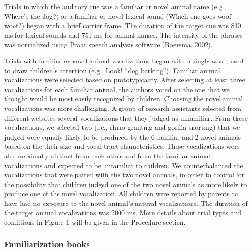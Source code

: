 \documentclass[english,floatsintext,man]{apa6}
\newcounter{author}
\theoremstyle{definition}
\theoremstyle{definition}
\theoremstyle{definition}
\theoremstyle{remark}
\begin{document}
Trials in which the auditory cue was a familiar or novel animal name
(e.g., Where's the dog?) or a familiar or novel lexical sound (Which one
goes woof-woof?) began with a brief carrier frame. The duration of the
target cue was 810 ms for lexical sounds and 750 ms for animal names.
The intensity of the phrases was normalized using Praat speech analysis
software (Boersma, 2002).

Trials with familiar or novel animal vocalizations began with a single
word, used to draw children's attention (e.g., Look! \enquote{dog
barking}). Familiar animal vocalizations were selected based on
prototypicality. After selecting at least three vocalizations for each
familiar animal, the authors voted on the one that we thought would be
most easily recognized by children. Choosing the novel animal
vocalizations was more challenging. A group of research assistants
selected from different websites several vocalizations that they judged
as unfamiliar. From these vocalizations, we selected two (i.e., rhino
grunting and gorilla snorting) that we judged were equally likely to be
produced by the 6 familiar and 2 novel animals based on the their size
and vocal tract characteristics. These vocalizations were also maximally
distinct from each other and from the familiar animal vocalizations and
expected to be unfamiliar to children. We counterbalanced the
vocalizations that were paired with the two novel animals, in order to
control for the possibility that children judged one of the two novel
animals as more likely to produce one of the novel vocalization. All
children were reported by parents to have had no exposure to the novel
animal's natural vocalizations. The duration of the target animal
vocalizations was 2000 ms. More details about trial types and conditions
in Figure 1 will be given in the Procedure section.

\subsubsection{Familiarization books}\label{familiarization-books}
\end{document}
